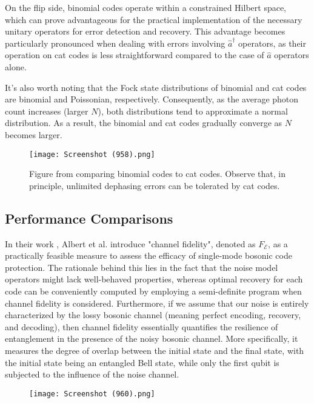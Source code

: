 \documentclass[11pt]{article}
\newcommand\0{\mathbf{0}}
\newcommand\<{\langle}
\renewcommand\>{\rangle}
\begin{document}
On the flip side, binomial codes operate within a constrained Hilbert space, which can prove advantageous for the practical implementation of the necessary unitary operators for error detection and recovery. This advantage becomes particularly pronounced when dealing with errors involving $\hat{a}^\dag$ operators, as their operation on cat codes is less straightforward compared to the case of $\hat{a}$ operators alone.

It's also worth noting that the Fock state distributions of binomial and cat codes are binomial and Poissonian, respectively. Consequently, as the average photon count increases (larger $N$), both distributions tend to approximate a normal distribution. As a result, the binomial and cat codes gradually converge as $N$ becomes larger.

\begin{figure}
\centering
\texttt{[image: Screenshot (958).png]}	
\caption{Figure from \cite{michael2016new} comparing binomial codes to cat codes. Observe that, in principle, unlimited dephasing errors can be tolerated by cat codes.}
\end{figure}

\subsection{Performance Comparisons}
\label{sec:perf}


In their work \cite{albert2017performance}, Albert et al. introduce "channel fidelity", denoted as $F_\mathcal{E}$, as a practically feasible measure to assess the efficacy of single-mode bosonic code protection. The rationale behind this lies in the fact that the noise model operators might lack well-behaved properties, whereas optimal recovery for each code can be conveniently computed by employing a semi-definite program when channel fidelity is considered. Furthermore, if we assume that our noise is entirely characterized by the lossy bosonic channel (meaning perfect encoding, recovery, and decoding), then channel fidelity essentially quantifies the resilience of entanglement in the presence of the noisy bosonic channel. More specifically, it measures the degree of overlap between the initial state and the final state, with the initial state being an entangled Bell state, while only the first qubit is subjected to the influence of the noise channel.

\begin{figure}[ht]
\label{fig:perf}
\centering
\texttt{[image: Screenshot (960).png]}	
\end{figure}
\end{document}
